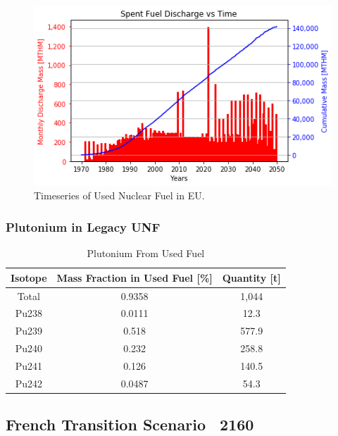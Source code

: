 \begin{frame}

\begin{figure}[htbp!]
	\begin{center}
			\includegraphics[scale=0.7]{./images/eu_future/snf_discharge.png}
	\end{center}
	\caption{Timeseries of Used Nuclear Fuel in \gls{EU}.}
	\label{fig:eu_snf}
\end{figure}

\end{frame}

\begin{frame}
	\frametitle{Plutonium in Legacy UNF}
	
\begin{table}[h]
	\centering
	\begin{tabular}{ccc}
		\hline
		\textbf{Isotope} & \textbf{Mass Fraction in Used Fuel [\%]} & \textbf{Quantity [t]} \\ \hline
		Total & 0.9358 & 1,044 \\ 
		Pu238 & 0.0111 & 12.3 \\ 
		Pu239 & 0.518 & 577.9 \\ 
		Pu240 & 0.232 & 258.8 \\ 
		Pu241 & 0.126 & 140.5 \\ 
		Pu242 & 0.0487 & 54.3 \\ \hline
	\end{tabular}
	\caption{Plutonium From Used Fuel}
	\label{tab:pu}
\end{table}
\end{frame}


\subsection{French Transition Scenario ~2160}

